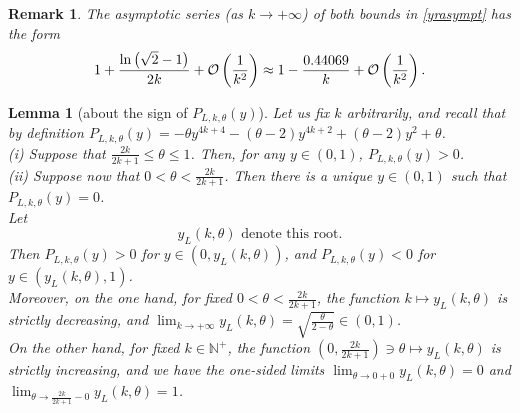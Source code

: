 \documentclass[smallextended,numbook,runningheads]{svjour3}     %
\newtheorem{lemma}{Lemma}
\newtheorem{remark}{Remark}
\newtheorem{lemma}{Lemma}
\newtheorem{remark}{Remark}
\newcommand{\te}{\theta}
\newcommand{\yl}{y_L(k,\theta)}
\newcommand{\nplus}{\mathbb{N}^+}
\newcommand{\Pol}{P_{L,k,\te}(y)}
\begin{document}
\begin{remark}
The asymptotic series (as $k\to+\infty$) of both bounds in \eqref{yrasympt} has the form
\[
1+\frac{\ln \left(\sqrt{2}-1\right)}{2 k}+{\cal{O}}\left(\frac{1}{k^2}\right)\approx 
1-\frac{0.44069}{k}+{\cal{O}}\left(\frac{1}{k^2}\right).
\]
\end{remark}






\begin{lemma}[about the sign of $\Pol$]\label{lem4} Let us fix $k$ arbitrarily, and recall that by definition 
$\Pol=-\theta  y^{4 k+4}-(\theta -2) y^{4 k+2}+(\theta -2) y^2+\theta$.\\
(i) Suppose that $\frac{2k}{2k+1}\le\te\le1$. Then, for any $y\in(0,1)$, $\Pol>0$.\\
(ii) Suppose now that $0<\te<\frac{2k}{2k+1}$. Then there is a unique $y\in(0,1)$ such that $\Pol=0$.\\ 
Let 
\begin{equation}\label{yldef}\yl \text{ denote this root.}\end{equation} 
Then $\Pol>0$ for $y\in(0,\yl)$, and $\Pol<0$ for $y\in(\yl,1)$.\\
Moreover, on the one hand, for fixed $0<\te<\frac{2k}{2k+1}$, the function $k\mapsto\yl$ is strictly decreasing, and $\lim_{k\to+\infty} \yl=\sqrt{\frac{\te}{2-\te}}\in(0,1)$.\\
On the other hand, for fixed $k\in\nplus$, the function $\left(0,\frac{2k}{2k+1}\right)\ni\te\mapsto\yl$ is strictly increasing, and we have the one-sided limits $\lim_{\te\to0+0} \yl=0$ and $\lim_{\te\to\frac{2k}{2k+1}-0} \yl=1$.
\end{lemma}
\end{document}

